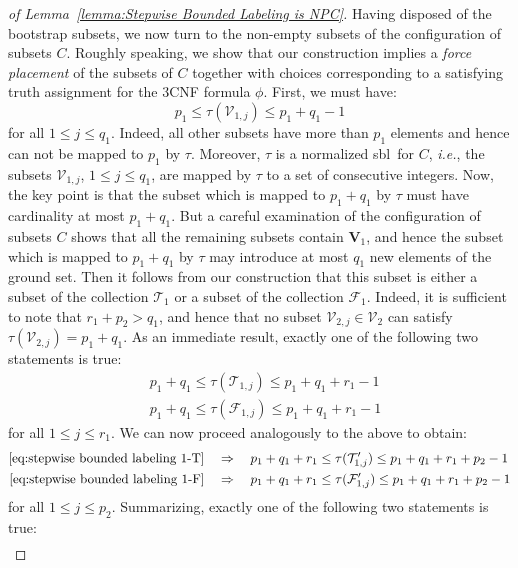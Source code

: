 \documentclass[a4paper,10pt]{llncs}
\newcommand{\SBL}{sbl}
\begin{document}
\begin{proof}[of Lemma~\ref{lemma:Stepwise Bounded Labeling is NPC}]
  Having disposed of the bootstrap subsets, we now turn to the non-empty
  subsets of the configuration of subsets $C$. Roughly speaking, we show
  that our construction implies a \emph{force placement} of the subsets
  of $C$ together with choices corresponding to a satisfying truth
  assignment for the $3$CNF formula $\phi$. First, we must have: 
  $$
  p_1 \leq \tau(\mathcal{V}_{1, j}) \leq p_1 + q_1 - 1
  $$
  for all $1 \leq j \leq q_1$. Indeed, all other subsets have more than
  $p_1$ elements and hence can not be mapped to $p_1$ by
  $\tau$. Moreover, $\tau$ is a normalized \SBL\ for
  $C$, \emph{i.e.}, the subsets $\mathcal{V}_{1, j}$, $1 \leq j \leq
  q_1$, are mapped by $\tau$ to a set of consecutive integers. Now, the
  key point is that the subset which is mapped to $p_1 + q_1$ by $\tau$
  must have cardinality at most $p_1 + q_1$. But a careful examination
  of the configuration of subsets $C$ shows that all the remaining
  subsets contain $\mathbf{V}_1$, and hence the subset which is mapped
  to $p_1 + q_1$ by $\tau$ may introduce at most $q_1$ new elements of
  the ground set. Then it follows from our construction that this subset
  is either a subset of the collection $\mathcal{T}_1$ or a subset of
  the collection $\mathcal{F}_1$. Indeed, it is sufficient to note that
  $r_1 + p_2 > q_1$, and hence that no subset $\mathcal{V}_{2, j} \in
  \mathcal{V}_2$ can satisfy $\tau(\mathcal{V}_{2, j}) = p_1 + q_1$. As
  an immediate result, exactly one of the following two statements is
  true: 
  \begin{align}
    &p_1 + q_1 \leq \tau(\mathcal{T}_{1, j}) \leq p_1 + q_1 + r_1 - 1
    \label{eq:stepwise bounded labeling 1-T} \\ 
    &p_1 + q_1 \leq \tau(\mathcal{F}_{1, j}) \leq p_1 + q_1 + r_1 - 1
    \label{eq:stepwise bounded labeling 1-F} 
  \end{align}
  for all $1 \leq j \leq r_1$. We can now proceed analogously to the
  above to obtain: 
  \begin{align*}
    \eqref{eq:stepwise bounded labeling 1-T} &\quad\Rightarrow\quad p_1 +
    q_1 + r_1 \leq \tau(\mathcal{T}'_{1, j}) \leq p_1 + q_1 + r_1 +p_2 - 1
    \\ 
    \eqref{eq:stepwise bounded labeling 1-F} &\quad\Rightarrow\quad p_1 +
    q_1 + r_1 \leq \tau(\mathcal{F}'_{1, j}) \leq p_1 + q_1 + r_1 +p_2 - 1 
  \end{align*}
  for all $1 \leq j \leq p_2$. Summarizing, exactly one of the following
  two statements is true: 
  \begin{align*}

\end{align*}
\end{proof}
\end{document}

